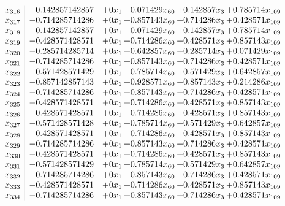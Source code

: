\documentclass[11pt]{article}
\begin{document}
\[\begin{array}{c| c c@{\hskip 2pt} c@{\hskip 2pt} c@{\hskip 2pt} c@{\hskip 2pt} }
 x_{316}   &  -0.142857142857 & + 0 x_{1} & + 0.071429 x_{60} & + 0.142857 x_{3} & + 0.785714 x_{109}\\
 x_{317}   &  -0.714285714286 & + 0 x_{1} & + 0.857143 x_{60} & + 0.714286 x_{3} & + 0.428571 x_{109}\\
 x_{318}   &  -0.142857142857 & + 0 x_{1} & + 0.071429 x_{60} & + 0.142857 x_{3} & + 0.785714 x_{109}\\
 x_{319}   &  -0.428571428571 & + 0 x_{1} & + 0.714286 x_{60} & + 0.428571 x_{3} & + 0.857143 x_{109}\\
 x_{320}   &  -0.285714285714 & + 0 x_{1} & + 0.642857 x_{60} & + 0.285714 x_{3} & + 0.071429 x_{109}\\
 x_{321}   &  -0.714285714286 & + 0 x_{1} & + 0.857143 x_{60} & + 0.714286 x_{3} & + 0.428571 x_{109}\\
 x_{322}   &  -0.571428571429 & + 0 x_{1} & + 0.785714 x_{60} & + 0.571429 x_{3} & + 0.642857 x_{109}\\
 x_{323}   &  -0.857142857143 & + 0 x_{1} & + 0.928571 x_{60} & + 0.857143 x_{3} & + 0.214286 x_{109}\\
 x_{324}   &  -0.714285714286 & + 0 x_{1} & + 0.857143 x_{60} & + 0.714286 x_{3} & + 0.428571 x_{109}\\
 x_{325}   &  -0.428571428571 & + 0 x_{1} & + 0.714286 x_{60} & + 0.428571 x_{3} & + 0.857143 x_{109}\\
 x_{326}   &  -0.428571428571 & + 0 x_{1} & + 0.714286 x_{60} & + 0.428571 x_{3} & + 0.857143 x_{109}\\
 x_{327}   &  -0.571428571428 & + 0 x_{1} & + 0.785714 x_{60} & + 0.571429 x_{3} & + 0.642857 x_{109}\\
 x_{328}   &  -0.428571428571 & + 0 x_{1} & + 0.714286 x_{60} & + 0.428571 x_{3} & + 0.857143 x_{109}\\
 x_{329}   &  -0.714285714286 & + 0 x_{1} & + 0.857143 x_{60} & + 0.714286 x_{3} & + 0.428571 x_{109}\\
 x_{330}   &  -0.428571428571 & + 0 x_{1} & + 0.714286 x_{60} & + 0.428571 x_{3} & + 0.857143 x_{109}\\
 x_{331}   &  -0.571428571429 & + 0 x_{1} & + 0.785714 x_{60} & + 0.571429 x_{3} & + 0.642857 x_{109}\\
 x_{332}   &  -0.714285714286 & + 0 x_{1} & + 0.857143 x_{60} & + 0.714286 x_{3} & + 0.428571 x_{109}\\
 x_{333}   &  -0.428571428571 & + 0 x_{1} & + 0.714286 x_{60} & + 0.428571 x_{3} & + 0.857143 x_{109}\\
 x_{334}   &  -0.714285714286 & + 0 x_{1} & + 0.857143 x_{60} & + 0.714286 x_{3} & + 0.428571 x_{109}\\

\end{array}\]
\end{document}
